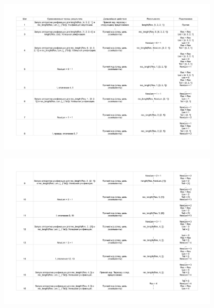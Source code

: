 \documentclass[12pt]{report}
\begin{document}
\begin{figure}[H]
	\begin{center}
		\includegraphics[scale=0.7]{imgs/table_17-1.pdf}
	\end{center}
\end{figure}
\vspace{-1.65cm}
\begin{figure}[H]
	\begin{center}
		\includegraphics[scale=0.7]{imgs/table_17-2.pdf}
	\end{center}
\end{figure}
\vspace{-1.65cm}
\end{document}
